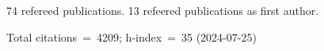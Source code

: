 74 refereed publications. 13 refeered publications as first author.

Total citations~=~4209; h-index~=~35 (2024-07-25)